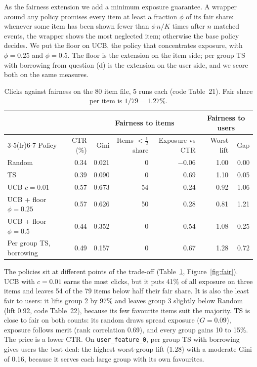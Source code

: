 \documentclass[11pt]{article}
\begin{document}
As the fairness extension we add a minimum exposure guarantee. A wrapper around
any policy promises every item at least a fraction $\phi$ of its fair share:
whenever some item has been shown fewer than $\phi\, n/K$ times after $n$
matched events, the wrapper shows the most neglected item; otherwise the base
policy decides. We put the floor on UCB, the policy that concentrates
exposure, with $\phi = 0.25$ and $\phi = 0.5$. The floor is the extension on
the item side; per group TS with borrowing from question (d) is the
extension on the user side, and we score both on the same measures.

\begin{table}[H]
  \centering
  \caption{Clicks against fairness on the 80 item file, 5 runs each
    (code Table~21). Fair share per item is $1/79 = 1.27\%$.}
  \label{tab:e}
  \footnotesize
  \setlength{\tabcolsep}{4pt}
  \begin{tabular}{lrrrrrr}
    \toprule
    & & \multicolumn{3}{c}{Fairness to items} & \multicolumn{2}{c}{Fairness to users} \\
    \cmidrule(lr){3-5}\cmidrule(lr){6-7}
    Policy & CTR (\%) & Gini & Items $<\tfrac12$ share & Exposure vs CTR & Worst lift & Gap \\
    \midrule
    Random                      & 0.34 & 0.021 &  0 & $-0.06$ & 1.00 & 0.00 \\
    TS                          & 0.39 & 0.090 &  0 & 0.69 & 1.10 & 0.05 \\
    UCB $c=0.01$                & 0.57 & 0.673 & 54 & 0.24 & 0.92 & 1.06 \\
    UCB + floor $\phi=0.25$     & 0.57 & 0.626 & 50 & 0.28 & 0.81 & 1.21 \\
    UCB + floor $\phi=0.5$      & 0.44 & 0.352 &  0 & 0.54 & 1.08 & 0.25 \\
    Per group TS, borrowing     & 0.49 & 0.157 &  0 & 0.67 & 1.28 & 0.72 \\
    \bottomrule
  \end{tabular}
\end{table}

The policies sit at different points of the trade-off (Table~\ref{tab:e},
Figure~\ref{fig:fair}). UCB with $c=0.01$ earns the most clicks, but it puts
41\% of all exposure on three items and leaves 54 of the 79 items below half
their fair share. It is also the least fair to users: it lifts group 2 by
97\% and leaves group 3 slightly below Random (lift 0.92, code Table~22),
because its few favourite items suit the majority. TS is close to fair on
both counts: its random draws spread exposure ($G=0.09$), exposure follows
merit (rank correlation 0.69), and every group gains 10 to 15\%. The price is
a lower CTR. On \texttt{user\_feature\_0}, per group TS with borrowing gives
users the best deal: the highest worst-group lift (1.28) with a moderate Gini
of 0.16, because it serves each large group with its own favourites.
\end{document}
